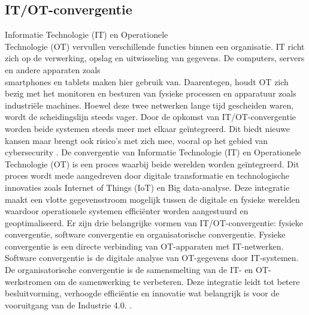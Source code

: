\subsection{IT/OT-convergentie}
Informatie Technologie (IT) en Operationele \\Technologie (OT) vervullen verschillende functies binnen een organisatie. IT richt zich op de verwerking, opslag en 
uitwisseling van gegevens. De computers, servers en andere apparaten zoals \\smartphones en tablets maken hier gebruik van. Daarentegen, houdt OT zich bezig met het 
monitoren en besturen van fysieke processen en apparatuur zoals industriële machines. Hoewel deze twee netwerken lange tijd gescheiden waren, 
\\wordt de scheidingslijn steeds vager. Door de opkomst van IT/OT-convergentie worden beide systemen steeds meer met elkaar geïntegreerd. Dit biedt nieuwe kansen
maar brengt ook risico’s met zich mee, vooral op het gebied van cybersecurity \autocite{onlogic2023}.
De convergentie van Informatie Technologie (IT) en Operationele Technologie (OT) is een proces waarbij beide werelden worden geïntegreerd. 
Dit proces wordt mede aangedreven door digitale transformatie en technologische innovaties zoals Internet of Things (IoT) en Big data-analyse. Deze integratie maakt een vlotte gegevensstroom mogelijk tussen de digitale en fysieke werelden
waardoor operationele systemen efficiënter worden aangestuurd en geoptimaliseerd. Er zijn drie belangrijke vormen van IT/OT-convergentie: fysieke convergentie, 
software convergentie en organisatorische convergentie. Fysieke convergentie is een directe verbinding van OT-apparaten met IT-netwerken. Software convergentie is
de digitale analyse van OT-gegevens door IT-systemen. De organisatorische convergentie is de samensmelting van de IT- en OT-werkstromen om de samenwerking te verbeteren.
Deze integratie leidt tot betere besluitvorming, verhoogde efficiëntie en innovatie wat belangrijk is voor de vooruitgang van de Industrie 4.0. \autocite{maleh2021ot,paloaltonetworks2023}.


